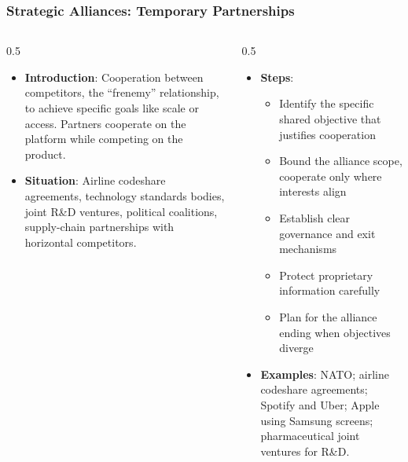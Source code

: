 \begin{frame}[fragile]\frametitle{Strategic Alliances: Temporary Partnerships}
\begin{columns}
    \begin{column}[T]{0.5\linewidth}
      \begin{itemize}
        \item \textbf{Introduction}: Cooperation between competitors, the ``frenemy'' relationship, to achieve specific goals like scale or access. Partners cooperate on the platform while competing on the product.
        \item \textbf{Situation}: Airline codeshare agreements, technology standards bodies, joint R\&D ventures, political coalitions, supply-chain partnerships with horizontal competitors.
      \end{itemize}
    \end{column}
    \begin{column}[T]{0.5\linewidth}
      \begin{itemize}
        \item \textbf{Steps}:
        \begin{itemize}
          \item Identify the specific shared objective that justifies cooperation
          \item Bound the alliance scope, cooperate only where interests align
          \item Establish clear governance and exit mechanisms
          \item Protect proprietary information carefully
          \item Plan for the alliance ending when objectives diverge
        \end{itemize}\item \textbf{Examples}: NATO; airline codeshare agreements; Spotify and Uber; Apple using Samsung screens; pharmaceutical joint ventures for R\&D.
      \end{itemize}
    \end{column}
  \end{columns}
\end{frame}


